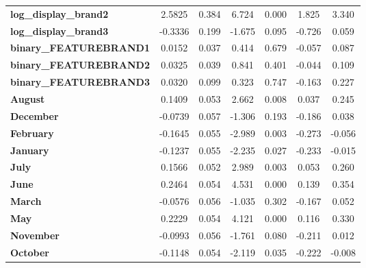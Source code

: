 \documentclass[a4paper,11pt]{article}
\begin{document}
\begin{center}
\begin{tabular}{lcccccc}
\textbf{log\_display\_brand2}  &       2.5825  &        0.384     &     6.724  &         0.000        &        1.825    &        3.340     \\
\textbf{log\_display\_brand3}  &      -0.3336  &        0.199     &    -1.675  &         0.095        &       -0.726    &        0.059     \\
\textbf{binary\_FEATUREBRAND1} &       0.0152  &        0.037     &     0.414  &         0.679        &       -0.057    &        0.087     \\
\textbf{binary\_FEATUREBRAND2} &       0.0325  &        0.039     &     0.841  &         0.401        &       -0.044    &        0.109     \\
\textbf{binary\_FEATUREBRAND3} &       0.0320  &        0.099     &     0.323  &         0.747        &       -0.163    &        0.227     \\
\textbf{August}                &       0.1409  &        0.053     &     2.662  &         0.008        &        0.037    &        0.245     \\
\textbf{December}              &      -0.0739  &        0.057     &    -1.306  &         0.193        &       -0.186    &        0.038     \\
\textbf{February}              &      -0.1645  &        0.055     &    -2.989  &         0.003        &       -0.273    &       -0.056     \\
\textbf{January}               &      -0.1237  &        0.055     &    -2.235  &         0.027        &       -0.233    &       -0.015     \\
\textbf{July}                  &       0.1566  &        0.052     &     2.989  &         0.003        &        0.053    &        0.260     \\
\textbf{June}                  &       0.2464  &        0.054     &     4.531  &         0.000        &        0.139    &        0.354     \\
\textbf{March}                 &      -0.0576  &        0.056     &    -1.035  &         0.302        &       -0.167    &        0.052     \\
\textbf{May}                   &       0.2229  &        0.054     &     4.121  &         0.000        &        0.116    &        0.330     \\
\textbf{November}              &      -0.0993  &        0.056     &    -1.761  &         0.080        &       -0.211    &        0.012     \\
\textbf{October}               &      -0.1148  &        0.054     &    -2.119  &         0.035        &       -0.222    &       -0.008     \\

\end{tabular}
\end{center}
\end{document}
